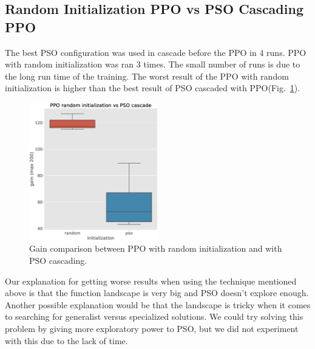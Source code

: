 \documentclass[conference]{IEEEtran}
\begin{document}
    \subsection{Random Initialization PPO vs PSO Cascading PPO}\label{subsec:random-initialization-ppo-vs-pso-cascading-ppo}
    The best PSO configuration was used in cascade before the PPO in 4 runs.
    PPO with random initialization was ran 3 times.
    The small number of runs is due to the long run time of the training.
    The worst result of the PPO with random initialization is higher than the best result
    of PSO cascaded with PPO\@ (Fig.~\ref{fig:random_vs_pso_initialization}).
    \begin{figure}[htbp]
        \centering
        \includegraphics[width=0.5\textwidth]{images/random_vs_pso_initialization.eps}
        \caption{Gain comparison between PPO with random initialization and with PSO cascading.}
        \label{fig:random_vs_pso_initialization}
    \end{figure}
    Our explanation for getting worse results when using the technique mentioned above is that the function landscape is very big and PSO doesn't explore enough. Another possible explanation would be that the landscape is tricky when it comes to searching for generalist versus specialized solutions. We could try solving this problem by giving more exploratory power to PSO, but we did not experiment with this due to the lack of time.
\end{document}
